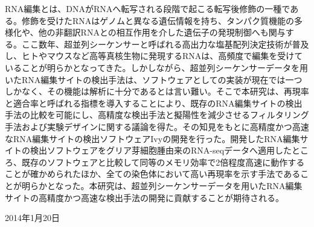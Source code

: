\begin{jabstract}
RNA編集とは、DNAがRNAへ転写される段階で起こる転写後修飾の一種である。修飾を受けたRNAはゲノムと異なる遺伝情報を持ち、タンパク質機能の多様化や、他の非翻訳RNAとの相互作用を介した遺伝子の発現制御へも関与する。ここ数年、超並列シーケンサーと呼ばれる高出力な塩基配列決定技術が普及し、ヒトやマウスなど高等真核生物に発現するRNAは、高頻度で編集を受けていることが明らかとなってきた。しかしながら、超並列シーケンサーデータを用いたRNA編集サイトの検出手法は、ソフトウェアとしての実装が現在では一つしかなく、その機能は解析に十分であるとは言い難い。そこで本研究は、再現率と適合率と呼ばれる指標を導入することにより、既存のRNA編集サイトの検出手法の比較を可能にし、高精度な検出手法と擬陽性を減少させるフィルタリング手法および実験デザインに関する議論を得た。その知見をもとに高精度かつ高速なRNA編集サイトの検出ソフトウェアIvyの開発を行った。開発したRNA編集サイトの検出ソフトウェアをグリア芽細胞腫由来のRNA-seqデータへ適用したところ、既存のソフトウェアと比較して同等のメモリ効率で2倍程度高速に動作することが確かめられたほか、全ての染色体において高い再現率を示す手法であることが明らかとなった。本研究は、超並列シーケンサーデータを用いたRNA編集サイトの高精度かつ高速な検出手法の開発に貢献することが期待される。
\end{jabstract}

\begin{flushright}
	\par
	2014年1月20日
\end{flushright}